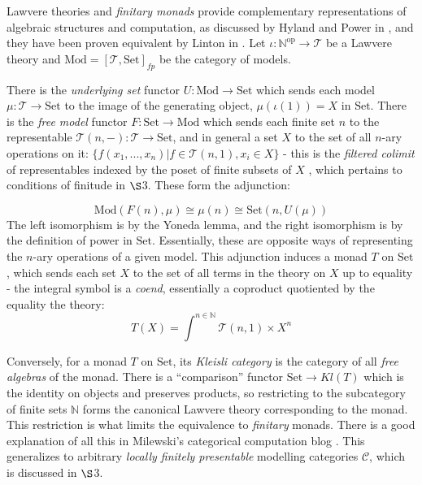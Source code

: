 \documentclass[a4paper,UKenglish]{article}
\theoremstyle{definition}
\def\ld{\rotatebox[origin=c]{-90}{$\dashv$}} %
\newcommand{\Set}{\mathrm{Set}}
\newcommand{\Mod}{\mathrm{Mod}}
\newcommand{\op}{\mathrm{op}}
\newcommand{\NN}{\mathbb{N}}
\newcommand{\C}{\mathscr{C}}
\newcommand{\T}{\mathscr{T}}
\begin{document}
Lawvere theories and \textit{finitary monads} provide complementary representations of algebraic structures and computation, as discussed by Hyland and Power in \cite{ltam}, and they have been proven equivalent by Linton in \cite{linton}. Let $\iota: \NN^\op \to \T$ be a Lawvere theory and $\Mod = [\T,\Set]_{fp}$ be the category of models.

\begin{center}
\end{center}

There is the \textit{underlying set} functor $U:\Mod \to \Set$ which sends each model $\mu: \T \to \Set$ to the image of the generating object, $\mu(\iota(1)) = X$ in $\Set$. There is the \textit{free model} functor $F:\Set \to \Mod$ which sends each finite set $n$ to the representable $\T(n,-):\T \to \Set$, and in general a set $X$ to the set of all $n$-ary operations on it: $\{f(x_1,...,x_n)|f\in \T(n,1), x_i\in X\}$ - this is the \textit{filtered colimit} of representables indexed by the poset of finite subsets of $X$ \cite{nlab}, which pertains to conditions of finitude in $\S$3. These form the adjunction:

$$\Mod(F(n),\mu) \cong \mu(n) \cong \Set(n,U(\mu))$$ The left isomorphism is by the Yoneda lemma, and the right isomorphism is by the definition of power in $\Set$. Essentially, these are opposite ways of representing the $n$-ary operations of a given model. This adjunction induces a monad $T$ on $\Set$, which sends each set $X$ to the set of all terms in the theory on $X$ up to equality - the integral symbol is a \textit{coend}, essentially a coproduct quotiented by the equality the theory: $$T(X) = \int^{n\in \NN} \T(n,1) \times X^n$$

Conversely, for a monad $T$ on $\Set$, its \textit{Kleisli category} is the category of all \textit{free algebras} of the monad. There is a ``comparison'' functor $\Set \to Kl(T)$ which is the identity on objects and preserves products, so restricting to the subcategory of finite sets $\NN$ forms the canonical Lawvere theory corresponding to the monad. This restriction is what limits the equivalence to \textit{finitary} monads. There is a good explanation of all this in Milewski's categorical computation blog \cite{milew}. This generalizes to arbitrary \textit{locally finitely presentable} modelling categories $\C$, which is discussed in $\S$3.
\end{document}
